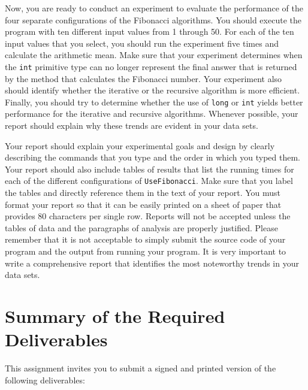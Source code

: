 Now, you are ready to conduct an experiment to evaluate the performance of the four separate configurations of the
Fibonacci algorithms. You should execute the program with ten different input values from 1 through 50. For each of the
ten input values that you select, you should run the experiment five times and calculate the arithmetic mean. Make sure
that your experiment determines when the {\tt int} primitive type can no longer represent the final answer that is
returned by the method that calculates the Fibonacci number. Your experiment also should identify whether the iterative
or the recursive algorithm is more efficient.  Finally, you should try to determine whether the use of {\tt long} or
{\tt int} yields better performance for the iterative and recursive algorithms. Whenever possible, your report should
explain why these trends are evident in your data sets.

Your report should explain your experimental goals and design by clearly describing the commands that you type and the
order in which you typed them. Your report should also include tables of results that list the running times for each of
the different configurations of {\tt UseFibonacci}.  Make sure that you label the tables and directly reference them in
the text of your report. You must format your report so that it can be easily printed on a sheet of paper that provides
80 characters per single row. Reports will not be accepted unless the tables of data and the paragraphs of analysis are
properly justified.  Please remember that it is not acceptable to simply submit the source code of your program and the
output from running your program. It is very important to write a comprehensive report that identifies the most
noteworthy trends in your data sets.

\section*{Summary of the Required Deliverables}

  This assignment invites you to submit a signed and printed version of the following deliverables: 

